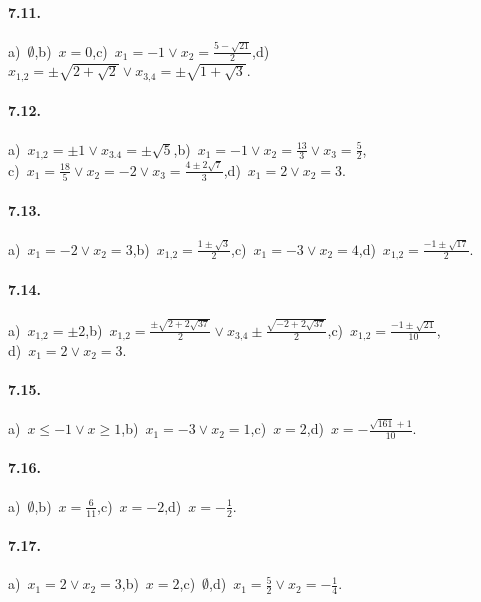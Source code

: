 \paragraph{7.11.} a)~$\emptyset $,\quad b)~$ x=0 $,\quad c)~$x_1=-1\vee x_2=\frac{5-\sqrt{21}} 2$,\quad d)~$x_{1\text{,}2}=\pm \sqrt{2+\sqrt 2}\vee x_{3\text{,}4}=\pm \sqrt{1+\sqrt 3}$.

\paragraph{7.12.} a)~$x_{1\text{,}2}=\pm 1\vee x_{3.4}=\pm \sqrt 5$,\quad b)~$x_1=-1\vee x_2=\frac{13} 3\vee x_3=\frac 5 2$,\protect\\
\quad c)~$x_1=\frac{18} 5\vee x_2=-2\vee x_3=\frac{4\pm 2\sqrt 7} 3$,\quad d)~$x_1=2\vee x_2=3$.

\paragraph{7.13.} a)~$x_1=-2\vee x_2=3$,\quad b)~$x_{1\text{,}2}=\frac{1\pm \sqrt 3} 2$,\quad c)~$x_1=-3\vee x_2=4$,\quad d)~$x_{1\text{,}2}=\frac{-1\pm \sqrt{17}} 2$.

\paragraph{7.14.} a)~$x_{1\text{,}2}=\pm 2$,\quad b)~$x_{1\text{,}2}=\frac{\pm \sqrt{2+2\sqrt{37}}} 2\vee x_{3\text{,}4}\pm \frac{\sqrt{-2+2\sqrt{37}}} 2$,\quad c)~$x_{1\text{,}2}=\frac{-1\pm \sqrt{21}}{10}$,\protect\\
\quad d)~$x_1=2\vee x_2=3$.

\paragraph{7.15.} a)~$x\le -1\vee x\ge 1$,\quad b)~$x_1=-3\vee x_2=1$,\quad c)~$x=2$,\quad d)~$x=-\frac{\sqrt{161}+1}{10}$.

\paragraph{7.16.} a)~$\emptyset$,\quad b)~$x=\frac{6}{11}$,\quad c)~$x=-2$,\quad d)~$x=-\frac{1}{2}$.

\paragraph{7.17.} a)~$x_1=2\vee x_2=3$,\quad b)~$x=2$,\quad c)~$\emptyset $,\quad d)~$x_1=\frac 5 2\vee x_2=-\frac 1 4$.

